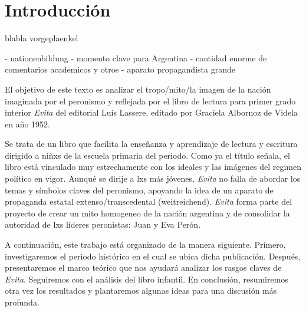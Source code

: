 \section{Introducción}
blabla vorgeplaenkel

- nationenbildung
- momento clave para Argentina
- cantidad enorme de comentarios academicos y otros
- aparato propagandista grande

El objetivo de este texto es analizar el tropo/mito/la imagen de la nación imaginada por el peronismo y reflejada por el libro de lectura para primer grado interior \textit{Evita} del editorial Luis Lassere, editado por Graciela Albornoz de Videla en año 1952.

Se trata de un libro que facilita la enseñanza y aprendizaje de lectura y escritura dirigido a niñxs de la escuela primaria del periodo.
Como ya el título señala, el libro está vinculado muy estrechamente con los ideales y las imágenes del regimen político en vigor.
Aunqué se dirije a lxs más jóvenes, \textit{Evita} no falla de abordar los temas y símbolos claves del peronismo, apoyando la idea de un aparato de propaganda estatal extenso/transcedental (weitreichend).
\textit{Evita} forma parte del proyecto de crear un mito homogeneo de la nación argentina
y de consolidar la autoridad de lxs líderes peronistas: Juan y Eva Perón.


A continuación, este trabajo está organizado de la manera siguiente.
Primero, investigaremos el periodo histórico en el cual se ubica dicha publicación.
Después, presentaremos el marco teórico que nos ayudará analizar los rasgos claves de \textit{Evita}.
Seguiremos con el análisis del libro infantil.
En conclusión, resumiremos otra vez los resultados y plantaremos algunas ideas para una discusión más profunda.

